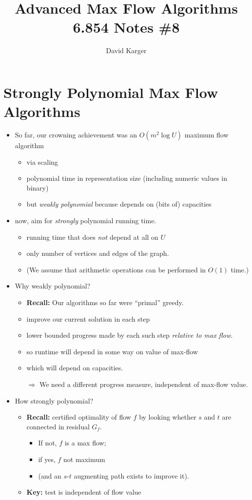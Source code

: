 \documentclass{article}
\title{Advanced Max Flow Algorithms\\ 6.854 Notes \#8}
\author{David Karger}
\begin{document}
\section{Strongly Polynomial Max Flow Algorithms}

\begin{itemize}
\item So far, our crowning achievement was an $O(m^2 \log U)$ maximum flow algorithm
  \begin{itemize}
  \item via scaling
  \item polynomial time in representation size (including numeric values in binary)
  \item but \emph{weakly polynomial} because depends on (bits of) capacities
\end{itemize}
\item now, aim for {\em strongly} polynomial running time.
  \begin{itemize}
  \item running time that does {\em not} depend at all on $U$
  \item only number of vertices and edges of the graph.
  \item (We assume that arithmetic operations can be performed in $O(1)$ time.)
  \end{itemize}
\item Why weakly polynomial?

  \begin{itemize}
  \item \textbf{Recall:} Our algorithms so far were ``primal'' greedy.
  \item  improve our current solution in each step
  \item lower bounded progress made by each such step \emph{relative to max flow}.
  \item so runtime will depend in some way on value of max-flow
  \item which will depend on capacities.
  \item[$\Rightarrow$] We need a different progress measure, independent of max-flow value. 
  \end{itemize}

\item How strongly polynomial?
  \begin{itemize}
  \item \textbf{Recall:} certified optimality of flow $f$ by looking whether $s$ and $t$ are connected in residual $G_f$.
    \begin{itemize}
    \item If not, $f$ is a max flow;
    \item if yes, $f$ not maximum
    \item (and an $s$-$t$ augmenting path exists to improve it). 
    \end{itemize}
  \item \textbf{Key:} test is independent of flow value


\end{itemize}
\end{itemize}
\end{document}
